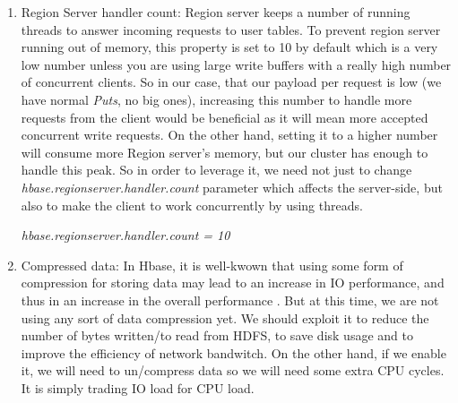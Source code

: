 \begin{enumerate}
\item Region Server handler count:
\bigskip
Region server keeps a number of running threads to answer incoming requests to user tables. To prevent region server running out of memory, this property is set to 10 by default which is a very low number unless you are using large write buffers with a really high number of concurrent clients. So in our case, that our payload per request is low (we have normal \textit{Puts}, no big ones), increasing this number to handle more requests from the client would be beneficial as it will mean more accepted concurrent write requests. On the other hand, setting it to a higher number will consume more Region server's memory, but our cluster has enough to handle this peak. So in order to leverage it, we need not just to change \textit{hbase.regionserver.handler.count} parameter which affects the server-side, but also to make the client to work concurrently by using threads.
\bigskip
\centerline{\textit{hbase.regionserver.handler.count = 10}}
\bigskip
\item Compressed data:
\bigskip
In Hbase, it is well-kwown that using some form of compression for storing data may lead to an increase in IO performance, and thus in an increase in the overall performance \cite{raichand2013short} \cite{cheng2013key} \cite{aiyer2012storage} \cite{ApacheHBaseCompression}. But at this time, we are not using any sort of data compression yet. We should exploit it to reduce the number of bytes written/to read from HDFS, to save disk usage and to improve the efficiency of network bandwitch. On the other hand, if we enable it, we will need to un/compress data so we will need some extra CPU cycles. It is simply trading IO load for CPU load.
\par

 \bigskip


\end{enumerate}
